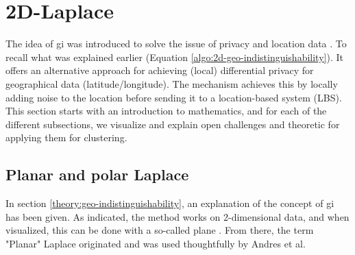 %
\section{2D-Laplace}
The idea of \gls{gi} was introduced to solve the issue of privacy and location data \citep{DBLP:journals/corr/abs-1212-1984}.
To recall what was explained earlier (Equation \ref{algo:2d-geo-indistinguishability}).
It offers an alternative approach for achieving (local) differential privacy for geographical data (latitude/longitude).
The mechanism achieves this by locally adding noise to the location before sending it to a location-based system (LBS).
This section starts with an introduction to mathematics, and for each of the different subsections, we visualize and explain open challenges and theoretic for applying them for clustering.
\subsection{Planar and polar Laplace}
In section \ref{theory:geo-indistinguishability}, an explanation of the concept of \gls{gi} has been given.
As indicated, the method works on 2-dimensional data, and when visualized, this can be done with a so-called plane \citep{DBLP:journals/corr/abs-1212-1984}.
From there, the term "Planar" Laplace originated and was used thoughtfully by Andres et al.

